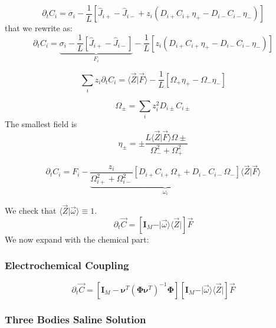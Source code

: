 \documentclass[aps,12pt]{revtex4}
\begin{document}
\begin{equation}
	\partial_t C_i = \sigma_i -\dfrac{1}{L} \left[ \hat J_{i+}- \hat J_{i-} + z_i (D_{i+} C_{i+} \eta_+ - D_{i-}C_{i-} \eta_-) \right] 
\end{equation}
that we rewrite as:
\begin{equation}
	\partial_t C_i =
	 \underbrace{\sigma_i -\dfrac{1}{L} \left[ \hat J_{i+}- \hat J_{i-} \right]}_{F_i} 
	 - \dfrac{1}{L}  \left[ z_i (D_{i+} C_{i+} \eta_+ - D_{i-}C_{i-} \eta_-)\right] 
\end{equation}


\begin{equation}
	\sum_i z_i \partial_t C_i =  \langle \vec Z \vert \vec F \rangle - \dfrac{1}{L} \left[ \Omega_+ \eta_{+} - \Omega_- \eta_-\right]
\end{equation}

\begin{equation}
	\Omega_\pm = \sum_i z_i^2 D_{i\pm} C_{i\pm}
\end{equation}
The smallest field is 
\begin{equation}
	\eta_\pm = \pm \dfrac{L \langle \vec Z \vert \vec F \rangle \Omega\pm}{\Omega_-^2+\Omega_+^2}
\end{equation}

\begin{equation}
	\partial_t C_i = F_i - \underbrace{\dfrac{z_i}{\Omega_{i+}^2 + \Omega_{i-}^2} \left[ D_{i+} C_{i+} \Omega_+ + D_{i-} C_{i-} \Omega_- \right]}_{\omega_i} \langle \vec Z \vert \vec F \rangle
\end{equation}

We check that $\langle \vec Z \vert \vec \omega \rangle \equiv 1$.
\begin{equation}
\boxed{
	\partial_t \vec C = \left[\bm I_M - \vert\vec \omega \rangle \langle \vec Z \vert \right] \vec F
	}
\end{equation}
We now expand with the chemical part:


\subsubsection{Electrochemical Coupling}

\begin{equation}
	\partial_t \vec C = \left[\bm{I}_M - \bm{\nu}^T (\bm \Phi \bm{\nu}^T) ^{-1} \bm \Phi \right] \left[\bm I_M - \vert\vec \omega \rangle \langle \vec Z \vert \right] \vec F
\end{equation}


\subsubsection{Three Bodies Saline Solution}
\end{document}
